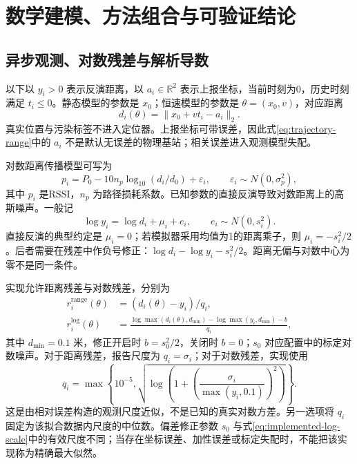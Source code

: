 \section{数学建模、方法组合与可验证结论}
\label{sec:theory}

\subsection{异步观测、对数残差与解析导数}

以下以 $y_i>0$ 表示反演距离，以 $a_i\in\mathbb R^2$ 表示上报坐标，当前时刻为0，历史时刻满足 $t_i\leq0$。静态模型的参数是 $x_0$；恒速模型的参数是 $\theta=(x_0,v)$，对应距离
\begin{equation}
 d_i(\theta)=\|x_0+v t_i-a_i\|_2.
 \label{eq:trajectory-range}
\end{equation}
真实位置与污染标签不进入定位器。上报坐标可带误差，因此式\eqref{eq:trajectory-range}中的 $a_i$ 不是默认无误差的物理基站；相关误差进入观测模型失配。

对数距离传播模型可写为
\begin{equation}
 p_i=P_0-10n_p\log_{10}(d_i/d_0)+\varepsilon_i,
 \qquad \varepsilon_i\sim N(0,\sigma_p^2),
 \label{eq:rssi-model}
\end{equation}
其中 $p_i$ 是RSSI，$n_p$ 为路径损耗系数。已知参数的直接反演导致对数距离上的高斯噪声\cite{patwari2003relative}。一般记
\begin{equation}
 \log y_i=\log d_i+\mu_i+e_i,
 \qquad e_i\sim N(0,s_i^2).
 \label{eq:log-observation}
\end{equation}
直接反演的典型约定是 $\mu_i=0$；若模拟器采用均值为1的距离乘子，则 $\mu_i=-s_i^2/2$。后者需要在残差中作负号修正：$\log d_i-\log y_i-s_i^2/2$。距离无偏与对数中心为零不是同一条件。

实现允许距离残差与对数残差，分别为
\begin{align}
 r_i^{\mathrm{range}}(\theta)&=(d_i(\theta)-y_i)/q_i,\\
 r_i^{\log}(\theta)&=
 \frac{\log\max(d_i(\theta),d_{\min})-
       \log\max(y_i,d_{\min})-b}{q_i},
 \label{eq:implemented-log-residual}
\end{align}
其中 $d_{\min}=0.1$ 米，修正开启时 $b=s_0^2/2$，关闭时 $b=0$；$s_0$ 对应配置中的标定对数噪声。对于距离残差，报告尺度为 $q_i=\sigma_i$；对于对数残差，实现使用
\begin{equation}
 q_i=\max\left\{10^{-5},\sqrt{\log\left(1+
       \left(\frac{\sigma_i}{\max(y_i,0.1)}\right)^2\right)}\right\}.
 \label{eq:implemented-log-scale}
\end{equation}
这是由相对误差构造的观测尺度近似，不是已知的真实对数方差。另一选项将 $q_i$ 固定为该拟合数据内尺度的中位数。偏差修正参数 $s_0$ 与式\eqref{eq:implemented-log-scale}中的有效尺度不同；当存在坐标误差、加性误差或标定失配时，不能把该实现称为精确最大似然。

